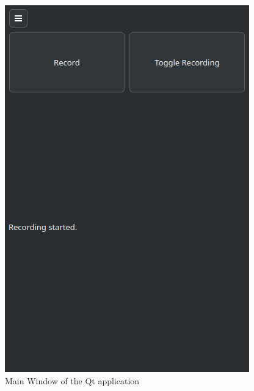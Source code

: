 \begin{figure}[H]
\centering
\begin{minipage}{0.45\textwidth}
    \centering
    \includegraphics[width=\textwidth]{assets/mainwindow_january.png}
    \caption{Main Window of the Qt application}
    \label{fig:mainwindow_january}
\end{minipage}
\hfill
\begin{minipage}{0.45\textwidth}
    \centering

\end{minipage}
\end{figure}
